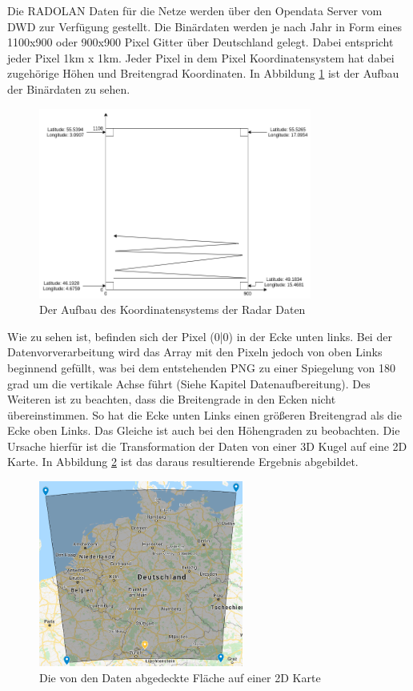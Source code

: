 Die RADOLAN Daten für die Netze werden über den Opendata Server vom DWD zur Verfügung gestellt. 
Die Binärdaten werden je nach Jahr in Form eines 1100x900 oder 900x900 Pixel Gitter über Deutschland gelegt.  
Dabei entspricht jeder Pixel 1km x 1km. Jeder Pixel in dem Pixel Koordinatensystem hat dabei zugehörige Höhen und 
Breitengrad Koordinaten. In Abbildung \ref{fig:radolan_koordinatensystem_aufbau} ist der Aufbau der Binärdaten zu sehen.
\begin{figure}[H]
 \centering
 \includegraphics[width=0.8\textwidth,angle=0]{abb/radolan_koordinatensystem_aufbau}
 \caption[Aufbau des Koordinatensystems von Binärdaten]{Der Aufbau des Koordinatensystems der Radar Daten}
\label{fig:radolan_koordinatensystem_aufbau}
\end{figure}
Wie zu sehen ist, befinden sich der Pixel (0|0) in der Ecke unten links. Bei der Datenvorverarbeitung wird das Array mit 
den Pixeln jedoch von oben Links beginnend gefüllt, was bei dem entstehenden PNG  zu einer Spiegelung von 180 grad 
um die vertikale Achse führt (Siehe Kapitel Datenaufbereitung). 
Des Weiteren ist zu beachten, dass die Breitengrade in den Ecken nicht übereinstimmen.
So hat die Ecke unten Links einen größeren Breitengrad als die Ecke oben Links. 
Das Gleiche ist auch bei den Höhengraden zu beobachten. Die Ursache hierfür ist die Transformation der Daten von einer 
3D Kugel auf eine 2D Karte. In Abbildung \ref{fig:karte_abdeckung_daten} ist das daraus resultierende Ergebnis abgebildet. 

\begin{figure}[H]
 \centering
 \includegraphics[width=0.6\textwidth,angle=0]{abb/karte_abdeckung_daten}
 \caption[Von Daten abgedeckte Fläche]{Die von den Daten abgedeckte Fläche auf einer 2D Karte}
\label{fig:karte_abdeckung_daten}
\end{figure}


